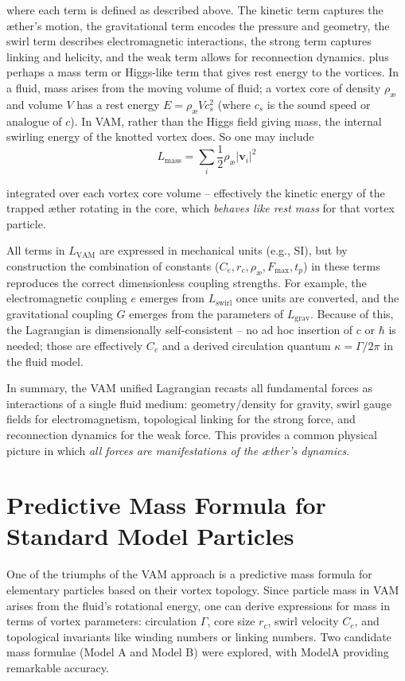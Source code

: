 \documentclass[a4paper,12pt]{article}
\begin{document}
        where each term is defined as described above. The kinetic term captures the æther’s motion, the gravitational term encodes the pressure and geometry, the swirl term describes electromagnetic interactions, the strong term captures linking and helicity, and the weak term allows for reconnection dynamics.
        plus perhaps a mass term or Higgs-like term that gives rest energy to the vortices. In a fluid, mass arises from the moving volume of fluid; a vortex core of density $\rho_{\text{\ae}}$ and volume $V$ has a rest energy $E = \rho_{\text{\ae}} V c_s^2$ (where $c_s$ is the sound speed or analogue of $c$). In VAM, rather than the Higgs field giving mass, the internal swirling energy of the knotted vortex does. So one may include
        \[
        L_{\text{mass}} = \sum_i \frac{1}{2}\rho_{\text{\ae}} |\mathbf{v}_i|^2
        \]

        integrated over each vortex core volume – effectively the kinetic energy of the trapped æther rotating in the core, which \textit{behaves like rest mass} for that vortex particle.
        
        All terms in $L_{\text{VAM}}$ are expressed in mechanical units (e.g., SI), but by construction the combination of constants ($C_e, r_c, \rho_{\text{\ae}}, F_{\max}, t_p$) in these terms reproduces the correct dimensionless coupling strengths. For example, the electromagnetic coupling $e$ emerges from $L_{\text{swirl}}$ once units are converted, and the gravitational coupling $G$ emerges from the parameters of $L_{\text{grav}}$. Because of this, the Lagrangian is dimensionally self-consistent – no ad hoc insertion of $c$ or $\hbar$ is needed; those are effectively $C_e$ and a derived circulation quantum $\kappa = \Gamma/2\pi$ in the fluid model.
        
        In summary, the VAM unified Lagrangian recasts all fundamental forces as interactions of a single fluid medium: geometry/density for gravity, swirl gauge fields for electromagnetism, topological linking for the strong force, and reconnection dynamics for the weak force. This provides a common physical picture in which \textit{all forces are manifestations of the æther’s dynamics}.

        \section{Predictive Mass Formula for Standard Model Particles}
        
        One of the triumphs of the VAM approach is a predictive mass formula for elementary particles based on their vortex topology. Since particle mass in VAM arises from the fluid’s rotational energy, one can derive expressions for mass in terms of vortex parameters: circulation $\Gamma$, core size $r_c$, swirl velocity $C_e$, and topological invariants like winding numbers or linking numbers. Two candidate mass formulae (Model A and Model B) were explored, with ModelA providing remarkable accuracy.
        
\end{document}
